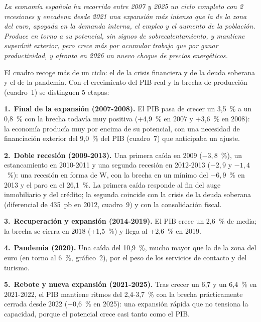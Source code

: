 \begin{examen}
\textit{La economía española ha recorrido entre 2007 y 2025 un ciclo completo con 2 recesiones y encadena desde 2021 una expansión más intensa que la de la zona del euro, apoyada en la demanda interna, el empleo y el aumento de la población. Produce en torno a su potencial, sin signos de sobrecalentamiento, y mantiene superávit exterior, pero crece más por acumular trabajo que por ganar productividad, y afronta en 2026 un nuevo choque de precios energéticos.}

El cuadro recoge más de un ciclo: el de la crisis financiera y de la deuda soberana y el de la pandemia. Con el crecimiento del PIB real y la brecha de producción (cuadro~1) se distinguen 5 etapas:

\textbf{1.}~\textbf{Final de la expansión (2007-2008).} El PIB pasa de crecer un 3,5~\% a un 0,8~\% con la brecha todavía muy positiva (+4,9~\% en 2007 y +3,6~\% en 2008): la economía producía muy por encima de su potencial, con una necesidad de financiación exterior del 9,0~\% del PIB (cuadro~7) que anticipaba un ajuste.


\textbf{2.}~\textbf{Doble recesión (2009-2013).} Una primera caída en 2009 ($-3{,}8$~\%), un estancamiento en 2010-2011 y una segunda recesión en 2012-2013 ($-2{,}9$ y $-1{,}4$~\%): una recesión en forma de W, con la brecha en un mínimo del $-6{,}9$~\% en 2013 y el paro en el 26,1~\%. La primera caída responde al fin del auge inmobiliario y del crédito; la segunda coincide con la crisis de la deuda soberana (diferencial de 435~pb en 2012, cuadro~9) y con la consolidación fiscal.


\textbf{3.}~\textbf{Recuperación y expansión (2014-2019).} El PIB crece un 2,6~\% de media; la brecha se cierra en 2018 (+1,5~\%) y llega al +2,6~\% en 2019.


\textbf{4.}~\textbf{Pandemia (2020).} Una caída del 10,9~\%, mucho mayor que la de la zona del euro (en torno al 6~\%, gráfico~2), por el peso de los servicios de contacto y del turismo.


\textbf{5.}~\textbf{Rebote y nueva expansión (2021-2025).} Tras crecer un 6,7 y un 6,4~\% en 2021-2022, el PIB mantiene ritmos del 2,4-3,7~\% con la brecha prácticamente cerrada desde 2022 (+0,6~\% en 2025): una expansión rápida que no tensiona la capacidad, porque el potencial crece casi tanto como el PIB.



\end{examen}
